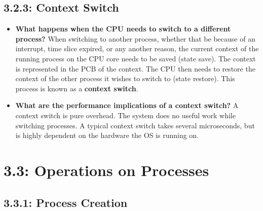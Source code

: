 \documentclass[12pt]{article}
\begin{document}
\subsection*{3.2.3: Context Switch}

\begin{itemize}
    \item \textbf{What happens when the CPU needs to switch to a different process?} When switching to another process, whether that be because of an interrupt, time slice expired, or any another reason, the current context of the running process on the CPU core needs to be saved (state save). The context is represented in the PCB of the context. The CPU then needs to restore the context of the other process it wishes to switch to (state restore). This process is known as a \textbf{context switch}.
    \item \textbf{What are the performance implications of a context switch?} A context switch is pure overhead. The system does no useful work while switching processes. A typical context switch takes several microseconds, but is highly dependent on the hardware the OS is running on.
\end{itemize}

\section*{3.3: Operations on Processes}

\subsection*{3.3.1: Process Creation}
\end{document}
